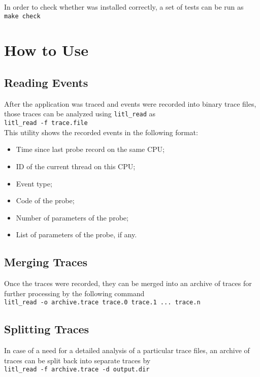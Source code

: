 In order to check whether \litl{} was installed correctly, a set of tests can be 
run as\\
    \hspace*{0.9cm}\texttt{make check}


\chapter{How to Use \litl{}}
\section{Reading Events}
After the application was traced and events were recorded into binary trace 
files, those traces can be analyzed using \texttt{litl\_read} as\\
    \hspace*{0.9cm}\texttt{litl\_read -f trace.file}\\
This utility shows the recorded events in the following format:
\begin{itemize}
 \item Time since last probe record on the same CPU;
 \item ID of the current thread on this CPU;
 \item Event type;
 \item Code of the probe;
 \item Number of parameters of the probe;
 \item List of parameters of the probe, if any.
\end{itemize}

\section{Merging Traces}
Once the traces were recorded, they can be merged into an archive of traces for
further processing by the following command\\
    \hspace*{0.9cm}\texttt{litl\_read  -o archive.trace trace.0 trace.1 ... trace.n}

\section{Splitting Traces}
In case of a need for a detailed analysis of a particular trace files, an archive
of traces can be split back into separate traces by\\
\hspace*{0.9cm}\texttt{litl\_read  -f archive.trace -d output.dir}

